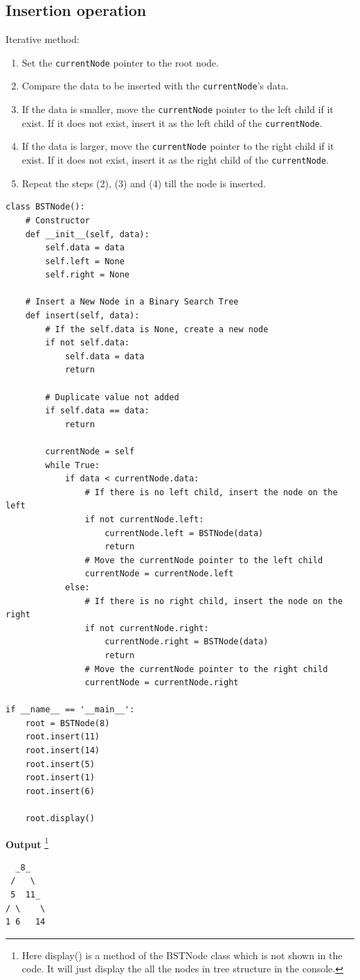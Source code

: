 \documentclass[a4paper,11pt]{book}
\begin{document}
\subsection{Insertion operation}

\noindent Iterative method: 
\begin{enumerate}
    \item Set the \lstinline{currentNode} pointer to the root node. 
    \item Compare the data to be inserted with the \lstinline{currentNode}'s data.
    \item If the data is smaller, move the \lstinline{currentNode} pointer to the left child if it exist. If it does not exist, insert it as the left child of the \lstinline{currentNode}.
    \item If the data is larger, move the \lstinline{currentNode} pointer to the right child if it exist. If it does not exist, insert it as the right child of the \lstinline{currentNode}.
    \item Repeat the steps (2), (3) and (4) till the node is inserted.
\end{enumerate} 
\begin{lstlisting}
class BSTNode():
    # Constructor
    def __init__(self, data):
        self.data = data
        self.left = None
        self.right = None
        
    # Insert a New Node in a Binary Search Tree 
    def insert(self, data):
        # If the self.data is None, create a new node
        if not self.data:
            self.data = data
            return

        # Duplicate value not added
        if self.data == data:
            return

        currentNode = self
        while True:
            if data < currentNode.data:
                # If there is no left child, insert the node on the left
                if not currentNode.left:
                    currentNode.left = BSTNode(data)
                    return
                # Move the currentNode pointer to the left child
                currentNode = currentNode.left
            else:
                # If there is no right child, insert the node on the right
                if not currentNode.right:
                    currentNode.right = BSTNode(data)
                    return
                # Move the currentNode pointer to the right child
                currentNode = currentNode.right
                
if __name__ == '__main__':
    root = BSTNode(8)
    root.insert(11)
    root.insert(14)
    root.insert(5)
    root.insert(1)
    root.insert(6)

    root.display() 
\end{lstlisting}
\textbf{Output} \footnote{Here display() is a method of the BSTNode class which is not shown in the code. It will just display the all the nodes in tree structure in the console.}
\begin{lstlisting}
  _8_   
 /   \  
 5  11_ 
/ \    \
1 6   14
\end{lstlisting}
\end{document}
